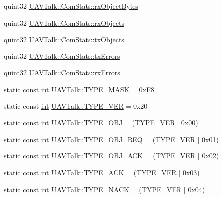 \begin{DoxyCompactItemize}
quint32 \hyperlink{group___u_a_v_talk_plugin_ga6a61f515e2c09de8fadddb1d8382a2a1}{U\-A\-V\-Talk\-::\-Com\-Stats\-::rx\-Object\-Bytes}
\item 
quint32 \hyperlink{group___u_a_v_talk_plugin_ga60c07de32f4130a7b761066819bf0712}{U\-A\-V\-Talk\-::\-Com\-Stats\-::rx\-Objects}
\item 
quint32 \hyperlink{group___u_a_v_talk_plugin_ga4d48878de025a87f65263e537467fb9b}{U\-A\-V\-Talk\-::\-Com\-Stats\-::tx\-Objects}
\item 
quint32 \hyperlink{group___u_a_v_talk_plugin_gaddc2324ebd5b83b73e1f873131efcccf}{U\-A\-V\-Talk\-::\-Com\-Stats\-::tx\-Errors}
\item 
quint32 \hyperlink{group___u_a_v_talk_plugin_ga52c1d5163810f507e6ca052884ee7ecc}{U\-A\-V\-Talk\-::\-Com\-Stats\-::rx\-Errors}
\item 
static const \hyperlink{ioapi_8h_a787fa3cf048117ba7123753c1e74fcd6}{int} \hyperlink{group___u_a_v_talk_plugin_gadad9ea7937a0ef8cf1a162fc2265e9c4}{U\-A\-V\-Talk\-::\-T\-Y\-P\-E\-\_\-\-M\-A\-S\-K} = 0x\-F8
\item 
static const \hyperlink{ioapi_8h_a787fa3cf048117ba7123753c1e74fcd6}{int} \hyperlink{group___u_a_v_talk_plugin_gad838c235ec5ef5e1389791d518faa6e7}{U\-A\-V\-Talk\-::\-T\-Y\-P\-E\-\_\-\-V\-E\-R} = 0x20
\item 
static const \hyperlink{ioapi_8h_a787fa3cf048117ba7123753c1e74fcd6}{int} \hyperlink{group___u_a_v_talk_plugin_ga160fa827bdb9b5114b132cf644f76d4c}{U\-A\-V\-Talk\-::\-T\-Y\-P\-E\-\_\-\-O\-B\-J} = (T\-Y\-P\-E\-\_\-\-V\-E\-R $|$ 0x00)
\item 
static const \hyperlink{ioapi_8h_a787fa3cf048117ba7123753c1e74fcd6}{int} \hyperlink{group___u_a_v_talk_plugin_ga5e1cb8e2b0aa00f08a16af9c858079e9}{U\-A\-V\-Talk\-::\-T\-Y\-P\-E\-\_\-\-O\-B\-J\-\_\-\-R\-E\-Q} = (T\-Y\-P\-E\-\_\-\-V\-E\-R $|$ 0x01)
\item 
static const \hyperlink{ioapi_8h_a787fa3cf048117ba7123753c1e74fcd6}{int} \hyperlink{group___u_a_v_talk_plugin_gafc2b2ad8c68063a80d64666d0e812572}{U\-A\-V\-Talk\-::\-T\-Y\-P\-E\-\_\-\-O\-B\-J\-\_\-\-A\-C\-K} = (T\-Y\-P\-E\-\_\-\-V\-E\-R $|$ 0x02)
\item 
static const \hyperlink{ioapi_8h_a787fa3cf048117ba7123753c1e74fcd6}{int} \hyperlink{group___u_a_v_talk_plugin_gaec2c5c58b05deb71a40e1248ff82aa52}{U\-A\-V\-Talk\-::\-T\-Y\-P\-E\-\_\-\-A\-C\-K} = (T\-Y\-P\-E\-\_\-\-V\-E\-R $|$ 0x03)
\item 
static const \hyperlink{ioapi_8h_a787fa3cf048117ba7123753c1e74fcd6}{int} \hyperlink{group___u_a_v_talk_plugin_ga809ec3528886e43e38072e2d16787668}{U\-A\-V\-Talk\-::\-T\-Y\-P\-E\-\_\-\-N\-A\-C\-K} = (T\-Y\-P\-E\-\_\-\-V\-E\-R $|$ 0x04)

\end{DoxyCompactItemize}
